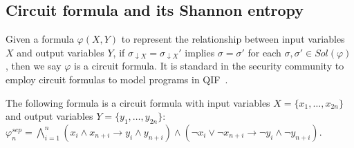 \begin{comment}
	\begin{example}\label{testenv-example}
		Given a CNF formula $\varphi = x_1  \wedge (x_1 \vee x_2 \vee x_5) \wedge (\neg x_1 \vee x_3) \wedge (\neg x_2 \vee \neg x_3) \wedge (x_2 \vee x_4 \vee \neg x_5)$, it has three implied literals $\{x_1, \neg x_2, x_3\}$.
		Then, $\varphi$ can be simplified as $x_1 \land \neg x_2 \land x_3 \land (x_4 \vee \neg x_5)$.
	\end{example}
\end{comment}




\subsection{Circuit formula and its Shannon entropy}
Given a formula $\varphi(X, Y)$ to represent the relationship between input variables $X$ and output variables $Y$, if $\sigma_{\downarrow X} = \sigma_{\downarrow X}'$ implies $\sigma = \sigma'$ for each $\sigma,\sigma' \in \mathit{Sol}(\varphi)$, then we say $\varphi$ is a circuit formula.
It is standard in the security community to employ circuit formulas to model programs in QIF~\cite{golia2022scalable}.

\begin{example}\label{circuit-example}
	The following formula is a circuit formula with input variables $X = \{x_1, \ldots, x_{2n} \}$ and output variables $Y = \{ y_1, \ldots, y_{2n}\}$:
	$\varphi_{n}^{\mathit{sep}} = \bigwedge_{i=1}^{n}(x_i \land x_{n+i} \rightarrow y_i \land y_{n+i})    
	\wedge (\lnot x_i \lor \lnot x_{n+i} \rightarrow \lnot y_i \land \lnot y_{n+i})$.
	\begin{comment}
		\begin{equation*}
			\begin{split}
				\varphi(X, Y) = & (x_1 \vee x_2) \wedge (\neg x_1 \vee x_2)
				\wedge (\neg x_1 \vee y_1)   \\ 
				\wedge (x_1 \vee \neg y_1) 
				\wedge  (x_3 \vee x_4 \vee y_1) \wedge  
				&  (\neg x_3 \vee \neg x_4 \vee y_3) \\ 
				\wedge (x_3 \vee \neg y_3) \wedge (x_4 \vee \neg y_3) \\ \wedge (y_1 \vee \neg y_2) \wedge (\neg x_1 \vee \neg y_2) .
			\end{split} 
		\end{equation*} 
	\end{comment}
\end{example}


